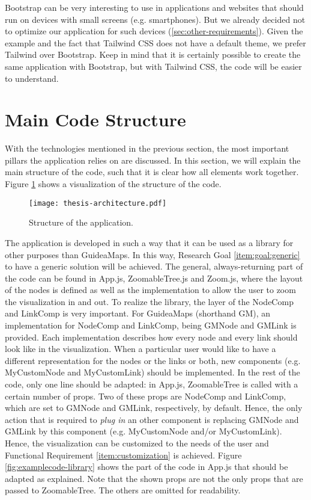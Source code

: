 Bootstrap can be very interesting to use in applications and websites that should run on devices with small screens (e.g. smartphones). But we already decided not to optimize our application for such devices (\ref{sec:other-requirements}). Given the example and the fact that Tailwind CSS does not have a default theme, we prefer Tailwind over Bootstrap. Keep in mind that it is certainly possible to create the same application with Bootstrap, but with Tailwind CSS, the code will be easier to understand.\\





\section{Main Code Structure}\label{sec:structure}
With the technologies mentioned in the previous section, the most important pillars the application relies on are discussed. In this section, we will explain the main structure of the code, such that it is clear how all elements work together. Figure \ref{fig:overall-structure} shows a visualization of the structure of the code.
\begin{figure}[H]
	\centering
	\texttt{[image: thesis-architecture.pdf]}
	\caption{Structure of the application.}
	\label{fig:overall-structure}
\end{figure}

The application is developed in such a way that it can be used as a library for other purposes than GuideaMaps. In this way, Research Goal \ref{item:goal:generic} to have a generic solution will be achieved. The general, always-returning part of the code can be found in App.js, ZoomableTree.js and Zoom.js, where the layout of the nodes is defined as well as the implementation to allow the user to zoom the visualization in and out. To realize the library, the layer of the NodeComp and LinkComp is very important. For GuideaMaps (shorthand GM), an implementation for NodeComp and LinkComp, being GMNode and GMLink is provided. Each implementation describes how every node and every link should look like in the visualization. When a particular user would like to have a different representation for the nodes or the links or both, new components (e.g. MyCustomNode and MyCustomLink) should be implemented. In the rest of the code, only one line should be adapted: in App.js, ZoomableTree is called with a certain number of props. Two of these props are NodeComp and LinkComp, which are set to GMNode and GMLink, respectively, by default. Hence, the only action that is required to \textit{plug in} an other component is replacing GMNode and GMLink by this component (e.g. MyCustomNode and/or MyCustomLink). Hence, the visualization can be customized to the needs of the user and Functional Requirement \ref{item:customization} is achieved. Figure \ref{fig:examplecode-library} shows the part of the code in App.js that should be adapted as explained. Note that the shown props are not the only props that are passed to ZoomableTree. The others are omitted for readability.

